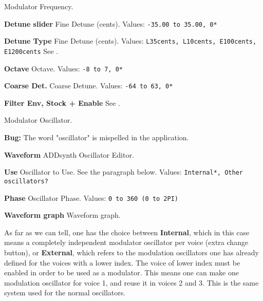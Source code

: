    Modulator Frequency.

   \begin{enumber}
      \item \textbf{Detune slider}
         Fine Detune (cents).
         Values: \texttt{-35.00 to 35.00, 0*}
      \item \textbf{Detune Type}
         Fine Detune (cents).
         Values: \texttt{L35cents, L10cents, E100cents, E1200cents}
         See .
      \item \textbf{Octave}
         Octave.
         Values: \texttt{-8 to 7, 0*}
      \item \textbf{Coarse Det.}
         Coarse Detune.
         Values: \texttt{-64 to 63, 0*}
      \item \textbf{Filter Env, Stock + Enable}
         See .
   \end{enumber}

   Modulator Oscillator.

   \textbf{Bug:}
   The word "oscillator" is mispelled in the application.

   \begin{enumber}
      \item \textbf{Waveform}
         ADDsynth Oscillator Editor.
      \item \textbf{Use}
         Oscillator to Use.
         See the paragraph below.
         Values: \texttt{Internal*, Other oscillators?}
      \item \textbf{Phase}
         Oscillator Phase.
         Values: \texttt{0 to 360 (0 to 2PI)}
      \item \textbf{Waveform graph}
         Waveform graph.
   \end{enumber}

   As far as we can tell, one has the choice between \textbf{Internal},
   which in this case means a completely independent modulator oscillator
   per voice (extra change button), or \textbf{External}, which refers to
   the modulation oscillators one has already defined for the voices with a
   lower index.
   The voice of lower index must be enabled in order to be used as a
   modulator.
   This means one can make one modulation oscillator for voice 1, and reuse it
   in voices 2 and 3.  This is the same system used for the normal
   oscillators.

